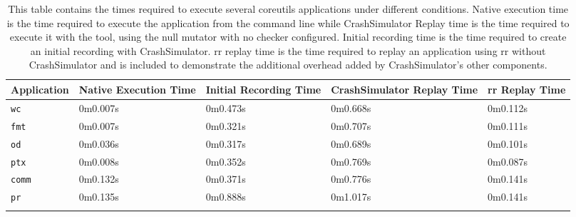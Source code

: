 %

 \begin{table}[t]
    \scriptsize{}
    \begin{tabular}{l p{1cm} p{1cm} p{1.2cm} p{1cm}}
    \toprule{}
        Application     & Native Execution Time & Initial Recording Time & CrashSimulator Replay Time & rr Replay Time  \\
\hline
        {\tt wc}        & 0m0.007s              & 0m0.473s               & 0m0.668s                   & 0m0.112s        \\
        {\tt fmt}       & 0m0.007s              & 0m0.321s               & 0m0.707s                   & 0m0.111s        \\
        {\tt od}        & 0m0.036s              & 0m0.317s               & 0m0.689s                   & 0m0.101s        \\
        {\tt ptx}       & 0m0.008s              & 0m0.352s               & 0m0.769s                   & 0m0.087s        \\
        {\tt comm}      & 0m0.132s              & 0m0.371s               & 0m0.776s                   & 0m0.141s        \\
        {\tt pr}        & 0m0.135s              & 0m0.888s               & 0m1.017s                   & 0m0.141s        \\
    \bottomrule{}
    \end{tabular}
    \caption{This table contains the times required to execute several coreutils applications under different conditions.
             Native execution time is the time required to execute the application from the command line while
             CrashSimulator Replay time is the time required to execute it with the tool, using the null mutator with no checker configured.
             Initial recording time is the time required to create an initial recording with CrashSimulator.  rr replay time is the
             time required to replay an application using rr without CrashSimulator and is included to demonstrate the additional
             overhead added by CrashSimulator's other components.}
    \label{table:performance}
\end{table}


